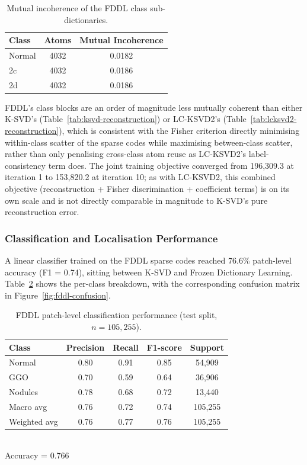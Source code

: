 \begin{table}[H]
\centering
\caption{Mutual incoherence of the FDDL class sub-dictionaries.}
\label{tab:fddl-reconstruction}
\begin{tabular}{lcc}
\hline
\textbf{Class} & \textbf{Atoms} & \textbf{Mutual Incoherence} \\
\hline
Normal   & 4032 & 0.0182 \\
2c       & 4032 & 0.0186 \\
2d       & 4032 & 0.0186 \\
\hline
\end{tabular}
\end{table}

FDDL's class blocks are an order of magnitude less mutually coherent than either K-SVD's
(Table~\ref{tab:ksvd-reconstruction}) or LC-KSVD2's (Table~\ref{tab:lcksvd2-reconstruction}), which
is consistent with the Fisher criterion directly minimising within-class scatter of the sparse
codes while maximising between-class scatter, rather than only penalising cross-class atom reuse
as LC-KSVD2's label-consistency term does. The joint training objective converged from
196{,}309.3 at iteration 1 to 153{,}820.2 at iteration 10; as with LC-KSVD2, this combined
objective (reconstruction + Fisher discrimination + coefficient terms) is on its own scale and is
not directly comparable in magnitude to K-SVD's pure reconstruction error.

\subsubsection{Classification and Localisation Performance}

A linear classifier trained on the FDDL sparse codes reached 76.6\% patch-level accuracy (F1 = 0.74),
sitting between K-SVD and Frozen Dictionary Learning. Table~\ref{tab:fddl-classification} shows the
per-class breakdown, with the corresponding confusion matrix in Figure~\ref{fig:fddl-confusion}.

\begin{table}[H]
\centering
\caption{FDDL patch-level classification performance (test split, $n=105{,}255$).}
\label{tab:fddl-classification}
\begin{tabular}{lcccc}
\hline
\textbf{Class} & \textbf{Precision} & \textbf{Recall} & \textbf{F1-score} & \textbf{Support} \\
\hline
Normal       & 0.80 & 0.91 & 0.85 & 54{,}909 \\
GGO          & 0.70 & 0.59 & 0.64 & 36{,}906 \\
Nodules      & 0.78 & 0.68 & 0.72 & 13{,}440 \\
\hline
Macro avg    & 0.76 & 0.72 & 0.74 & 105{,}255 \\
Weighted avg & 0.76 & 0.77 & 0.76 & 105{,}255 \\
\hline
\end{tabular}
\\[4pt]
Accuracy = 0.766
\end{table}

